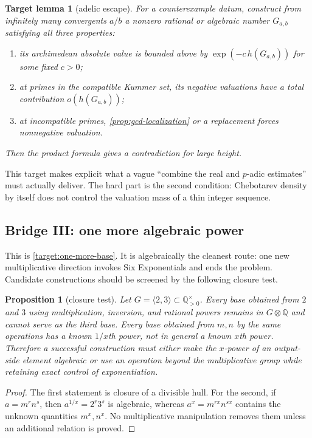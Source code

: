 \documentclass[11pt,oneside]{article}
\newtheorem{proposition}[theorem]{Proposition}
\newtheorem{target}[theorem]{Target lemma}
\theoremstyle{definition}
\theoremstyle{remark}
\newcommand{\Q}{\mathbb{Q}}
\begin{document}
\begin{target}[adelic escape]\label{target:adelic-escape}
For a counterexample datum, construct from infinitely many convergents $a/b$
a nonzero rational or algebraic number $G_{a,b}$ satisfying all three
properties:
\begin{enumerate}
\item its archimedean absolute value is bounded above by
      $\exp(-c\,h(G_{a,b}))$ for some fixed $c>0$;
\item at primes in the compatible Kummer set, its negative valuations have a
      total contribution $o(h(G_{a,b}))$;
\item at incompatible primes, \cref{prop:gcd-localization} or a replacement
      forces nonnegative valuation.
\end{enumerate}
Then the product formula gives a contradiction for large height.
\end{target}

This target makes explicit what a vague ``combine the real and $p$-adic
estimates'' must actually deliver.  The hard part is the second condition:
Chebotarev density by itself does not control the valuation mass of a thin
integer sequence.

\subsection{Bridge III: one more algebraic power}

This is \cref{target:one-more-base}.  It is algebraically the cleanest route:
one new multiplicative direction invokes Six Exponentials and ends the
problem.  Candidate constructions should be screened by the following
closure test.

\begin{proposition}[closure test]\label{prop:closure-test}
Let $G=\langle2,3\rangle\subset\Q_{>0}^{\times}$.  Every base obtained from
$2$ and $3$ using multiplication, inversion, and rational powers remains in
$G\otimes\Q$ and cannot serve as the third base.  Every base obtained from
$m,n$ by the same operations has a known $1/x$th power, not in general a
known $x$th power.  Therefore a successful construction must either make the
$x$-power of an output-side element algebraic or use an operation beyond the
multiplicative group while retaining exact control of exponentiation.
\end{proposition}

\begin{proof}
The first statement is closure of a divisible hull.  For the second, if
$a=m^rn^s$, then $a^{1/x}=2^r3^s$ is algebraic, whereas
$a^x=m^{rx}n^{sx}$ contains the unknown quantities $m^x,n^x$.  No
multiplicative manipulation removes them unless an additional relation is
proved.
\end{proof}
\end{document}
